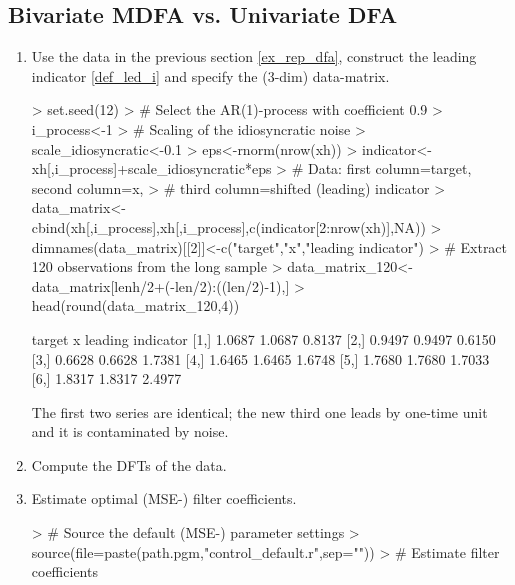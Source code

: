 \documentclass[a4paper]{book}
\begin{document}
\subsection{Bivariate MDFA vs. Univariate DFA}\label{bimdfaudfa}

\begin{enumerate}
\item Use the data in the previous section \ref{ex_rep_dfa}, construct the leading indicator \ref{def_led_i} and specify the (3-dim) data-matrix.
\begin{Schunk}
\begin{Sinput}
> set.seed(12)
> # Select the AR(1)-process with coefficient 0.9
> i_process<-1
> # Scaling of the idiosyncratic noise
> scale_idiosyncratic<-0.1
> eps<-rnorm(nrow(xh))
> indicator<-xh[,i_process]+scale_idiosyncratic*eps
> # Data: first column=target, second column=x, 
> #   third column=shifted (leading) indicator
> data_matrix<-cbind(xh[,i_process],xh[,i_process],c(indicator[2:nrow(xh)],NA))
> dimnames(data_matrix)[[2]]<-c("target","x","leading indicator")
> # Extract 120 observations from the long sample
> data_matrix_120<-data_matrix[lenh/2+(-len/2):((len/2)-1),]
> head(round(data_matrix_120,4))
\end{Sinput}
\begin{Soutput}
     target      x leading indicator
[1,] 1.0687 1.0687            0.8137
[2,] 0.9497 0.9497            0.6150
[3,] 0.6628 0.6628            1.7381
[4,] 1.6465 1.6465            1.6748
[5,] 1.7680 1.7680            1.7033
[6,] 1.8317 1.8317            2.4977
\end{Soutput}
\end{Schunk}
The first two series are identical; the new third one leads by one-time unit and it is contaminated by noise.
\item Compute the DFTs of the data.
\begin{Schunk}
\end{Schunk}
\item Estimate optimal (MSE-) filter coefficients.
\begin{Schunk}
\begin{Sinput}
> # Source the default (MSE-) parameter settings
> source(file=paste(path.pgm,"control_default.r",sep=""))
> # Estimate filter coefficients

\end{Sinput}
\end{Schunk}
\end{enumerate}
\end{document}
